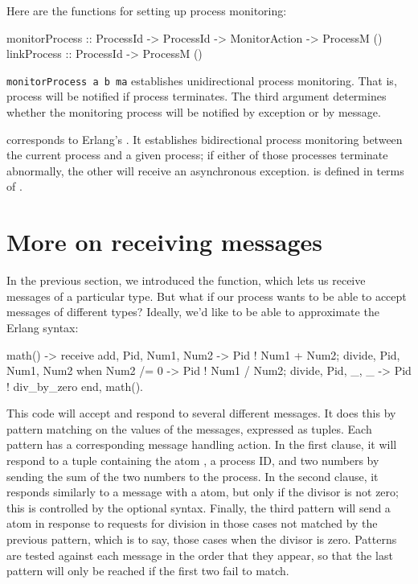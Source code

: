 \documentclass[preprint]{sigplanconf}
\begin{document}
Here are the functions for setting up process monitoring:

\begin{code}
monitorProcess :: ProcessId -> ProcessId
               -> MonitorAction -> ProcessM ()
linkProcess    :: ProcessId -> ProcessM ()
\end{code}

\lstinline!monitorProcess a b ma! establishes unidirectional process monitoring. That is, process  will be notified if process  terminates. The third argument determines whether the monitoring process will be notified by exception or by message.

 corresponds to Erlang's . It establishes bidirectional process monitoring between the current process and a given process; if either of those processes terminate abnormally, the other will receive an asynchronous exception.  is defined in terms of . 


\section{More on receiving messages}

In the previous section, we introduced the  function, which lets us receive messages of a particular type. But what if our process wants to be able to accept messages of different types? Ideally, we'd like to be able to approximate the Erlang  syntax:

\begin{code}[language=Erlang]
math() ->
  receive
    {add, Pid, Num1, Num2} -> 
      Pid ! Num1 + Num2;
    {divide, Pid, Num1, Num2} when Num2 /= 0 -> 
      Pid ! Num1 / Num2;
    {divide, Pid, _, _} ->
      Pid ! div_by_zero
  end,
  math().
\end{code}

This code will accept and respond to several different messages. It does this by pattern matching on the values of the messages, expressed as tuples. Each pattern has a corresponding message handling action. In the first clause, it will respond to a tuple containing the atom , a process ID, and two numbers by sending the sum of the two numbers to the process. In the second clause, it responds similarly to a message with a  atom, but only if the divisor is not zero; this is controlled by the optional  syntax. Finally, the third pattern will send a  atom in response to requests for division in those cases not matched by the previous pattern, which is to say, those cases when the divisor is zero. Patterns are tested against each message in the order that they appear, so that the last pattern will only be reached if the first two fail to match.
\end{document}

